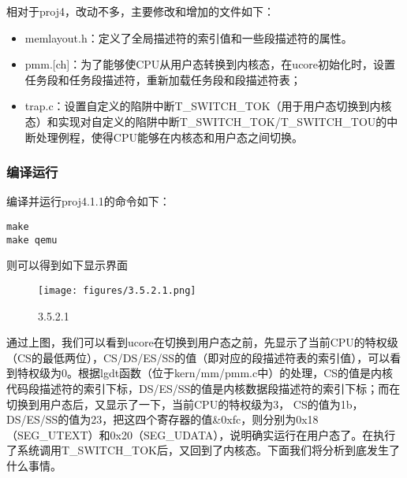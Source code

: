 相对于proj4，改动不多，主要修改和增加的文件如下：

\begin{itemize}
\tightlist
\item
  memlayout.h：定义了全局描述符的索引值和一些段描述符的属性。
\item
  pmm.{[}ch{]}：为了能够使CPU从用户态转换到内核态，在ucore初始化时，设置任务段和任务段描述符，重新加载任务段和段描述符表；
\item
  trap.c：设置自定义的陷阱中断T\_SWITCH\_TOK（用于用户态切换到内核态）和实现对自定义的陷阱中断T\_SWITCH\_TOK/T\_SWITCH\_TOU的中断处理例程，使得CPU能够在内核态和用户态之间切换。
\end{itemize}

\subsubsection{编译运行}\label{ux7f16ux8bd1ux8fd0ux884c}

编译并运行proj4.1.1的命令如下：

\begin{lstlisting}
make
make qemu
\end{lstlisting}

则可以得到如下显示界面

\begin{figure}[htbp]
\centering
\texttt{[image: figures/3.5.2.1.png]}
\caption{3.5.2.1}
\end{figure}

通过上图，我们可以看到ucore在切换到用户态之前，先显示了当前CPU的特权级（CS的最低两位），CS/DS/ES/SS的值（即对应的段描述符表的索引值），可以看到特权级为0。根据lgdt函数（位于kern/mm/pmm.c中）的处理，CS的值是内核代码段描述符的索引下标，DS/ES/SS的值是内核数据段描述符的索引下标；而在切换到用户态后，又显示了一下，当前CPU的特权级为3，
CS的值为1b，DS/ES/SS的值为23，把这四个寄存器的值\&0xfc，则分别为0x18（SEG\_UTEXT）和0x20（SEG\_UDATA），说明确实运行在用户态了。在执行了系统调用T\_SWITCH\_TOK后，又回到了内核态。下面我们将分析到底发生了什么事情。
